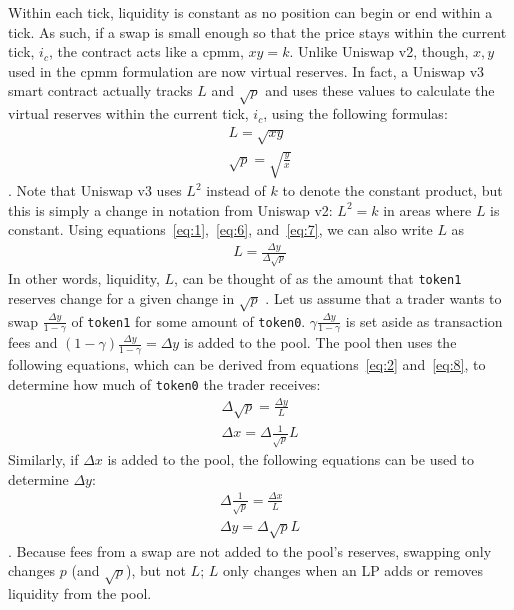 \documentclass[11pt]{article}
\begin{document}
Within each tick, liquidity is constant as no position can begin or end within a tick. As such, if a swap is small enough so that the price stays within the current tick, $i_c$, the contract acts like a \gls{cpmm}, $xy=k$. Unlike Uniswap v2, though, $x, y$ used in the \gls{cpmm} formulation are now virtual reserves. In fact, a Uniswap v3 smart contract actually tracks $L$ and $\sqrt{p}$ and uses these values to calculate the virtual reserves within the current tick, $i_c$, using the following formulas:
\begin{gather}
    L = \sqrt{xy} \label{eq:6}\\
    \sqrt{p} = \sqrt{\frac{y}{x}}\label{eq:7}
\end{gather}
\citep{Uniswapv3}. Note that Uniswap v3 uses $L^2$ instead of $k$ to denote the constant product, but this is simply a change in notation from Uniswap v2: $L^2 = k$ in areas where $L$ is constant. Using equations~\eqref{eq:1},~\eqref{eq:6}, and~\eqref{eq:7}, we can also write $L$ as
\begin{gather}
    L = \frac{\Delta y}{\Delta \sqrt{p}}\label{eq:8}
\end{gather}
In other words, liquidity, $L$, can be thought of as the amount that \texttt{token1} reserves change for a given change in $\sqrt{p}$ \citep{Uniswapv3}. Let us assume that a trader wants to swap $\frac{\Delta y}{1 - \gamma}$ of \texttt{token1} for some amount of \texttt{token0}. $\gamma \frac{\Delta y}{1 - \gamma}$ is set aside as transaction fees and $(1 - \gamma) \frac{\Delta y}{1 - \gamma} = \Delta y$ is added to the pool. The pool then uses the following equations, which can be derived from equations~\eqref{eq:2} and~\eqref{eq:8}, to determine how much of \texttt{token0} the trader receives:
\begin{gather}
    \Delta \sqrt{p} = \frac{\Delta y}{L} \\
    \Delta x = \Delta \frac{1}{\sqrt{p}} L
\end{gather}
Similarly, if $\Delta x$ is added to the pool, the following equations can be used to determine $\Delta y$:
\begin{gather}
    \Delta \frac{1}{\sqrt{p}} = \frac{\Delta x}{L} \\
    \Delta y = \Delta \sqrt{p} L
\end{gather}
\citep{Uniswapv3}. Because fees from a swap are not added to the pool's reserves, swapping only changes $p$ (and $\sqrt{p}$), but not $L$; $L$ only changes when an LP adds or removes liquidity from the pool.
\end{document}
